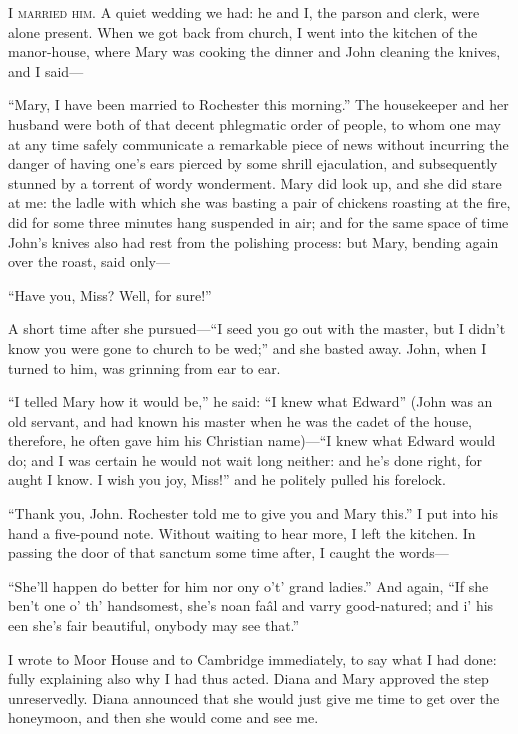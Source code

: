 
 \textsc{I married him.} A quiet wedding we had: he and I, the parson and
clerk, were alone present. When we got back from church, I went into
the kitchen of the manor-house, where Mary was cooking the dinner and
John cleaning the knives, and I said---

\enquote{Mary, I have been married to \Mr{} Rochester this morning.} The
housekeeper and her husband were both of that decent phlegmatic order of
people, to whom one may at any time safely communicate a remarkable
piece of news without incurring the danger of having one's ears pierced
by some shrill ejaculation, and subsequently stunned by a torrent of
wordy wonderment. Mary did look up, and she did stare at me: the ladle
with which she was basting a pair of chickens roasting at the fire, did
for some three minutes hang suspended in air; and for the same space of
time John's knives also had rest from the polishing process: but Mary,
bending again over the roast, said only---

\enquote{Have you, Miss? Well, for sure!}

A short time after she pursued---\enquote{I seed you go out with the
	master, but I didn't know you were gone to church to be wed;} and she
basted away. John, when I turned to him, was grinning from ear to ear.

\enquote{I telled Mary how it would be,} he said: \enquote{I knew what
	\Mr{} Edward} (John was an old servant, and had known his master when he
was the cadet of the house, therefore, he often gave him his Christian
name)---\enquote{I knew what \Mr{} Edward would do; and I was certain he
	would not wait long neither: and he's done right, for aught I know. I
	wish you joy, Miss!} and he politely pulled his forelock.

\enquote{Thank you, John. \Mr{} Rochester told me to give you and Mary
	this.} I put into his hand a five-pound note. Without waiting to hear
more, I left the kitchen. In passing the door of that sanctum some time
after, I caught the words---

\enquote{She'll happen do better for him nor ony o't' grand ladies.}
And again, \enquote{If she ben't one o' th' handsomest, she's noan faâl
	and varry good-natured; and i' his een she's fair beautiful, onybody may
	see that.}

I wrote to Moor House and to Cambridge immediately, to say what I had
done: fully explaining also why I had thus acted. Diana and Mary
approved the step unreservedly. Diana announced that she would just
give me time to get over the honeymoon, and then she would come and see
me.

